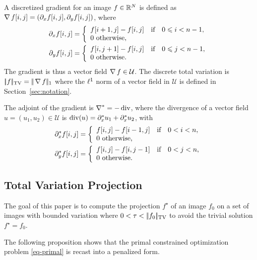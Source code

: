 \documentclass[11pt,nofonttune,a4paper]{IEEEtran}
\newcommand{\Um}{\mathcal{U}}
\begin{document}
A discretized gradient for an image $f \in \mathbb{R}^N$ is defined as $\operatorname{\nabla} f[i,j] = (\partial_x f[i,j],\partial_y f[i,j])$, where
\begin{align*}
	\partial_x f[i,j]& = 
	\left\{ \begin{array}{l} 
		f[i+1,j]-f[i,j] \quad \text{if} \quad 0 \leqslant i < n-1,\\
		0 \text{ otherwise,}
	 \end{array} \right.\\
	\partial_y f[i,j]& = 
	\left\{ \begin{array}{l} 
		f[i,j+1]-f[i,j] \quad \text{if} \quad 0 \leqslant j < n-1,\\
		0 \text{ otherwise}.
	 \end{array} \right.
\end{align*}
The gradient is thus a vector field $\grad f \in \Um$. The discrete total variation is $|\!| f |\!|_{\text{TV}} = |\!| \operatorname{\nabla} f |\!|_{1}$ where the $\ell^1$ norm of a vector field in $\Um$ is defined in Section~\ref{sec:notation}.

The adjoint of the gradient is $\operatorname{\nabla}^* = -\operatorname{div}$, where the divergence of a vector field $u = (u_1,u_2) \in \Um$ is
$\operatorname{div}(u) = \partial_x^* u_1 + \partial_x^* u_2$, with
\begin{align*}
	\partial_x^* f[i,j]& = 
	\left\{ \begin{array}{l} 
		f[i,j]-f[i-1,j] \quad \text{if} \quad 0 < i < n,\\
		0 \text{ otherwise,}
	 \end{array} \right.\\
	\partial_y^* f[i,j]& = 
	\left\{ \begin{array}{l} 
		f[i,j]-f[i,j-1] \quad \text{if} \quad 0 < j < n,\\
		0 \text{ otherwise}.
	 \end{array} \right.
\end{align*}

\subsection{Total Variation Projection}

The goal of this paper is to compute the projection $f^\star$ of an image $f_0$ on a set of images with bounded variation
where $0 < \tau < |\!| f_0 |\!|_{\text{TV}}$ to avoid the trivial solution $f^\star = f_0$.

The following proposition shows that the primal constrained optimization problem \eqref{eq-primal} is recast into a penalized form.
\end{document}
